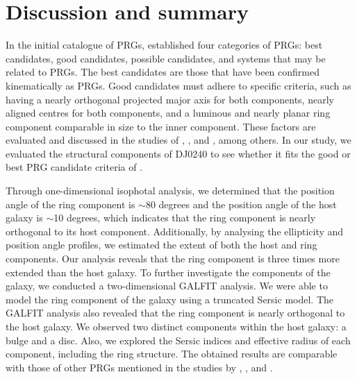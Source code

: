 \documentclass{aa}
\begin{document}
\section{Discussion and summary}
\label{sec:dis-sum}
In the initial catalogue of PRGs, \citet{whitmore1990} established four categories of PRGs: best candidates, good candidates, possible candidates, and systems that may be related to PRGs. The best candidates are those that have been confirmed kinematically as PRGs. Good candidates must adhere to specific criteria, such as having a nearly orthogonal projected major axis for both components, nearly aligned centres for both components, and a luminous and nearly planar ring component comparable in size to the inner component. These factors are evaluated and discussed in the studies of \citet{2013Smirnova}, \citet{2015Reshetnikov}, and \cite{2022Mosenkov}, among others. In our study, we evaluated the structural components of DJ0240 to see whether it fits the good or best PRG candidate criteria of \citet{whitmore1990}.\par
Through one-dimensional isophotal analysis, we determined that the position angle of the ring component is $\sim$80 degrees and the position angle of the host galaxy is $\sim$10 degrees, which indicates that the ring component is nearly orthogonal to its host component. Additionally, by analysing the ellipticity and position angle profiles, we estimated the extent of both the host and ring components. Our analysis reveals that the ring component is three times more extended than the host galaxy. To further investigate the components of the galaxy, we conducted a two-dimensional GALFIT analysis. We were able to model the ring component of the galaxy using a truncated Sersic model. The GALFIT analysis also revealed that the ring component is nearly orthogonal to the host galaxy. We observed two distinct components within the host galaxy: a bulge and a disc. Also, we explored the Sersic indices and effective radius of each component, including the ring structure. The obtained results are comparable with those of other PRGs mentioned in the studies by \citet{2013Smirnova}, \citet{2015Reshetnikov}, and \citet{2022Mosenkov}. \par
\end{document}
